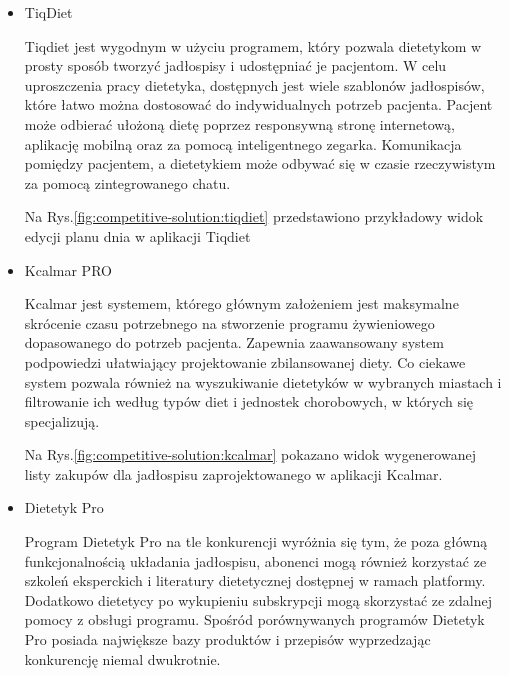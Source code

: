 \begin{itemize}
    \item TiqDiet\cite{url:tiqdiet}

        Tiqdiet jest wygodnym w użyciu programem, który pozwala dietetykom w prosty sposób tworzyć jadłospisy i udostępniać je pacjentom.
        W celu uproszczenia pracy dietetyka, dostępnych jest wiele szablonów jadłospisów, które łatwo można dostosować do indywidualnych potrzeb pacjenta.
        Pacjent może odbierać ułożoną dietę poprzez responsywną stronę internetową, aplikację mobilną oraz za pomocą inteligentnego zegarka.
        Komunikacja pomiędzy pacjentem, a dietetykiem może odbywać się w czasie rzeczywistym za pomocą zintegrowanego chatu.

        Na Rys.\ref{fig:competitive-solution:tiqdiet} przedstawiono przykładowy widok edycji planu dnia w aplikacji Tiqdiet

    \item Kcalmar PRO\cite{url:kcalmar}

        Kcalmar jest systemem, którego głównym założeniem jest maksymalne skrócenie czasu potrzebnego na stworzenie programu żywieniowego dopasowanego do potrzeb pacjenta.
        Zapewnia zaawansowany system podpowiedzi ułatwiający projektowanie zbilansowanej diety.
        Co ciekawe system pozwala również na wyszukiwanie dietetyków w wybranych miastach i filtrowanie ich według typów diet i jednostek chorobowych, w których się specjalizują.

        Na Rys.\ref{fig:competitive-solution:kcalmar} pokazano widok wygenerowanej listy zakupów dla jadłospisu zaprojektowanego w aplikacji Kcalmar.

    \item Dietetyk Pro\cite{url:dietetyk-pro}

        Program Dietetyk Pro na tle konkurencji wyróżnia się tym, że poza główną funkcjonalnością układania jadłospisu, abonenci mogą również korzystać ze szkoleń eksperckich i literatury dietetycznej dostępnej w ramach platformy.
        Dodatkowo dietetycy po wykupieniu subskrypcji mogą skorzystać ze zdalnej pomocy z obsługi programu.
        Spośród porównywanych programów Dietetyk Pro posiada największe bazy produktów i przepisów wyprzedzając konkurencję niemal dwukrotnie.


\end{itemize}

